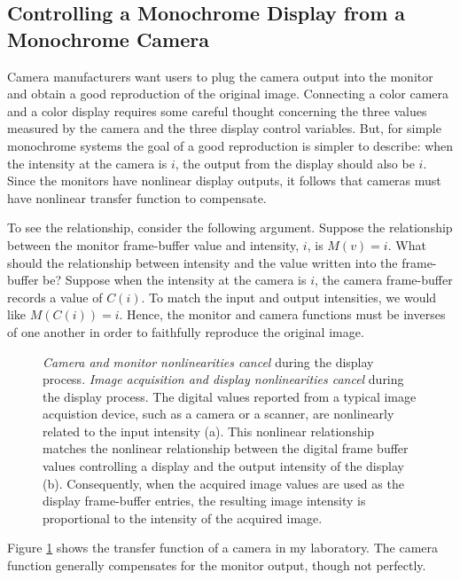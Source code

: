 \subsection*{Controlling a Monochrome Display from a Monochrome Camera}
Camera manufacturers
want users to plug the camera output into the monitor and
obtain a good reproduction of the original image.
Connecting a color camera and a color display requires some
careful thought concerning the three values measured
by the camera and the three display control variables.
But, for simple monochrome systems the goal 
of a good reproduction is simpler to describe:
when the intensity at the camera is $i$,
the output from the display should also be $i$.
Since the monitors have nonlinear display outputs,
it follows that cameras must have nonlinear transfer function
to compensate.

To see the relationship, consider the following argument.
Suppose the relationship between the monitor frame-buffer
value and intensity, $i$, is $M(v) = i$.
What should the relationship between intensity
and the value written into the frame-buffer be?
Suppose when the intensity at the camera is $i$, the
camera frame-buffer records a value of $C(i)$.
To match the input and output intensities,
we would like $M(C(i)) = i$.
Hence, the monitor and camera functions
must be inverses of one another in order to faithfully
reproduce the original image.

\begin{figure}
\centerline{
}
\caption[Camera and Monitor Nonlinearities Cancel]{
{\em Camera and monitor nonlinearities cancel}
during the display process.
{\em Image acquisition and display nonlinearities cancel}
during the display process.
The digital values reported from a typical image acquistion
device, such as a camera or a scanner, are nonlinearly related
to the input intensity (a).
This nonlinear relationship matches the
nonlinear relationship between the digital frame buffer
values controlling a display and the output intensity of the display (b).
Consequently, when the acquired image values are used
as the display frame-buffer entries,
the resulting image intensity is proportional
to the intensity of the acquired image.
}
\label{f11:displayCamera}
\end{figure}
Figure \ref{f11:displayCamera} shows the transfer
function of a camera in my laboratory.
The camera function generally compensates for the monitor
output, though not perfectly.

